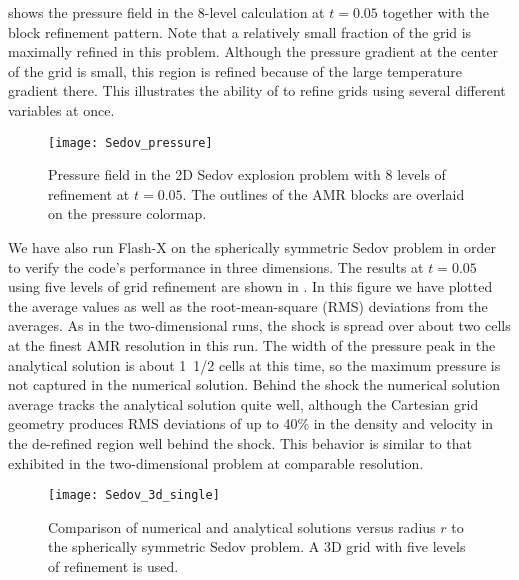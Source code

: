  shows the pressure field in the
8-level calculation at $t=0.05$ together with the block refinement
pattern. Note that a relatively small fraction of the grid is
maximally refined in this problem. Although the pressure gradient at
the center of the grid is small, this region is refined because of
the large temperature gradient there. This illustrates the ability
of \Paramesh to refine grids using several different variables at
once.
\begin{figure}[!ht]
\begin{center}
{\leavevmode\texttt{[image: Sedov\_pressure]}}
\end{center}
\caption{\label{Fig:Sedov refinement} Pressure field in the
2D Sedov explosion problem with 8 levels of refinement at $t=0.05$.
The outlines of the AMR blocks are overlaid on the pressure colormap.
}
\end{figure}


%

We have also run Flash-X on the spherically symmetric Sedov problem in
order to verify the code's performance in three dimensions. The
results at $t=0.05$ using five levels of grid refinement are shown
in . In this figure we have plotted the
average values as well as the root-mean-square (RMS) deviations from
the averages. As in the two-dimensional runs, the shock is spread
over about two cells at the finest AMR resolution in this run. The
width of the pressure peak in the analytical solution is about 1~1/2
cells at this time, so the maximum pressure is not captured in the
numerical solution. Behind the shock the numerical solution average
tracks the analytical solution quite well, although the Cartesian
grid geometry produces RMS deviations of up to 40\% in the density
and velocity in the de-refined region well behind the shock. This
behavior is similar to that exhibited in the two-dimensional problem
at comparable resolution.
\begin{figure}
\begin{center}
{\leavevmode\texttt{[image: Sedov\_3d\_single]}}
\end{center}
\caption{\label{Fig:Sedov 3D single} Comparison of numerical and analytical
solutions versus radius $r$ to the spherically symmetric Sedov problem. A 3D grid with
five levels of refinement is used.
}
\end{figure}

